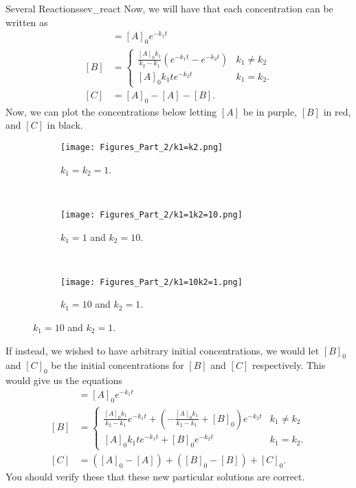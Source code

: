 \begin{ex}{Several Reactions}{sev_react}
        Now, we will have that each concentration can be written as
        \begin{align*}
            [A]&=[A]_0e^{-k_1t}\\
            [B]&=\begin{cases}
        \frac{[A]_0k_1}{k_2-k_1}\left( e^{-k_1t}-e^{-k_2t}\right) & k_1\neq k_2\\
        [A]_0k_1te^{-k_2t} & k_1=k_2.
        \end{cases}\\
        [C]&=[A]_0-[A]-[B].
        \end{align*}
        Now, we can plot the concentrations below letting $[A]$ be in purple, $[B]$ in red, and $[C]$ in black.
        \begin{figure}[H]
    \centering
    \begin{subfigure}[h]{0.3\textwidth}
        \texttt{[image: Figures\_Part\_2/k1=k2.png]}
        \caption{$k_1=k_2=1$.}
    \end{subfigure}
    ~
    \begin{subfigure}[h]{0.3\textwidth}
        \texttt{[image: Figures\_Part\_2/k1=1k2=10.png]}
        \caption{$k_1=1$ and $k_2=10$.}
    \end{subfigure}
    ~
    \begin{subfigure}[h]{0.3\textwidth}
        \texttt{[image: Figures\_Part\_2/k1=10k2=1.png]}
        \caption{$k_1=10$ and $k_2=1$.}
    \end{subfigure}

        \end{figure}

        If instead, we wished to have arbitrary initial concentrations, we would let $[B]_0$ and $[C]_0$ be the initial concentrations for $[B]$ and $[C]$ respectively.  This would give us the equations
        \begin{align*}
            [A]&=[A]_0e^{-k_1t}\\
            [B]&=\begin{cases}
                \frac{[A]_0k_1}{k_2-k_1}e^{-k_1t}+\left( -\frac{[A]_0k_1}{k_2-k_1}+[B]_0\right)e^{-k_2t} & k_1\neq k_2\\
                [A]_0k_1te^{-k_1t}+[B]_0e^{-k_2t} & k_1=k_2.
            \end{cases}\\
            [C]&=([A]_0-[A])+([B]_0-[B])+[C]_0.
        \end{align*}
        You should verify these that these new particular solutions are correct.
        \end{ex}

